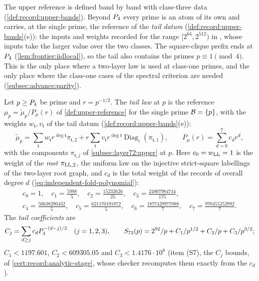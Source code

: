 The upper reference is defined band by band with class-three data
(\cref{def:record:upper-bands}). Beyond $P_4$ every prime is an atom of
its own and carries, at the single prime, the reference of the \emph{tail
datum} (\cref{def:record:upper-bands}(e)): the inputs and weights recorded for
the range $[2^{64},2^{512})$ in
, whose inputs take
the larger value over the two classes. The square-clique prefix ends at $P_4$
(\cref{lem:frontier:iidlocal}),
so the tail also contains the primes $p\equiv1\pmod4$. This is the only place
where a two-layer law is used at class-one primes, and the only place where
the class-one cases of the spectral criterion are needed
(\cref{subsec:advance:parity}).

\begin{definition}\label{def:tail-law}
Let $p\ge P_4$ be prime and $r=p^{-1/2}$. The \emph{tail law} at $p$ is the
reference $\mu_p=\widetilde\mu_p/P_\mu(r)$ of \cref{def:upper-reference} for
the single prime $\mathcal B=\{p\}$, with the weights $w_{\mathfrak t},v_{\mathfrak t}$
of the tail datum (\cref{def:record:upper-bands}(e)):
\[
 \widetilde\mu_p=\sum_{\mathfrak t}w_{\mathfrak t}r^{\deg\mathfrak t}\pi_{\mathfrak t,2}
 +r\sum_{\mathfrak t}v_{\mathfrak t}r^{\deg\mathfrak t}
 \operatorname{Diag}_\iota(\pi_{\mathfrak t,1}),\qquad
 P_\mu(r)=\sum_{d=0}^7c_dr^d,
\]
with the components $\pi_{\mathfrak t,j}$ of \cref{subsec:layer72:upper} at
$p$. Here $c_0=w_{\rm LL}=1$ is the weight of the \emph{root} $\pi_{\rm LL,2}$,
the uniform law on the injective strict-square labellings of the two-layer root
graph, and $c_d$ is the total weight of the records of overall degree $d$
(\eqref{eq:independent-fold-polynomial}):
\begin{gather*}
 c_0=1,\quad c_1=\tfrac{5988}{5},\quad c_2=\tfrac{15232626}{25},\quad
 c_3=\tfrac{24807984744}{175},\\
 c_4=\tfrac{50638290432}{5},\quad c_5=\tfrac{621170191872}{5},\quad
 c_6=\tfrac{1877429977088}{7},\quad c_7=\tfrac{970455252992}{7}.
\end{gather*}
The \emph{tail coefficients} are
\begin{equation}\label{eq:tail-coefficients}
 C_j=\sum_{d\ge j}c_dP_4^{-(d-j)/2}\quad(j=1,2,3),\qquad
 S_{72}(p)=2^{92}/p+C_1/p^{1/2}+C_2/p
 +C_3/p^{3/2};
\end{equation}
$C_1<1197.601$, $C_2<609305.05$ and $C_3<1.4176\cdot10^8$ (item (S7), the $C_j$ bounds, of
\cref{cert:record:analytic-stage}, whose checker recomputes them exactly from
the $c_d$).
\end{definition}

